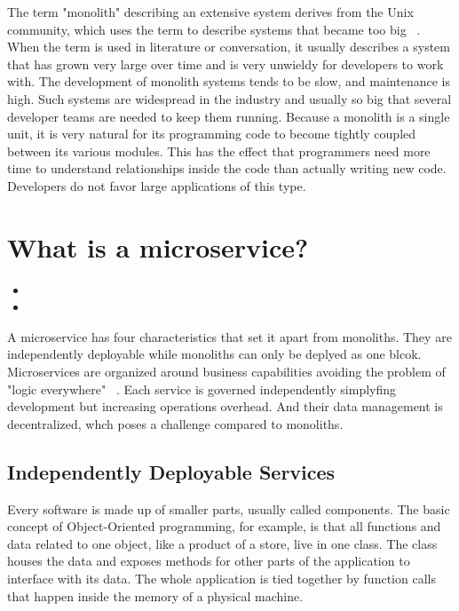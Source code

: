 The term "monolith" describing an extensive system derives from the Unix community, which uses the term to describe systems that became too big ~\cite{raymond.2003}. When the term is used in literature or conversation, it usually describes a system that has grown very large over time and is very unwieldy for developers to work with. The development of monolith systems tends to be slow, and maintenance is high. Such systems are widespread in the industry and usually so big that several developer teams are needed to keep them running. Because a monolith is a single unit, it is very natural for its programming code to become tightly coupled between its various modules. This has the effect that programmers need more time to understand relationships inside the code than actually writing new code. Developers do not favor large applications of this type.



\section{What is a microservice?}
\label{sec:theory:what}

\begin{itemize}
  \item {}
  \item {}
\end{itemize}

A microservice has four characteristics that set it apart from monoliths. They are independently deployable while monoliths can only be deplyed as one blcok. Microservices are organized around business capabilities avoiding the problem of "logic everywhere" ~\cite{microservices.2014}. Each service is governed independently simplyfing development but increasing operations overhead. And their data management is decentralized, whch poses a challenge compared to monoliths.

\subsection{Independently Deployable Services}

Every software is made up of smaller parts, usually called components. The basic concept of Object-Oriented programming, for example, is that all functions and data related to one object, like a product of a store, live in one class. The class houses the data and exposes methods for other parts of the application to interface with its data. The whole application is tied together by function calls that happen inside the memory of a physical machine.

